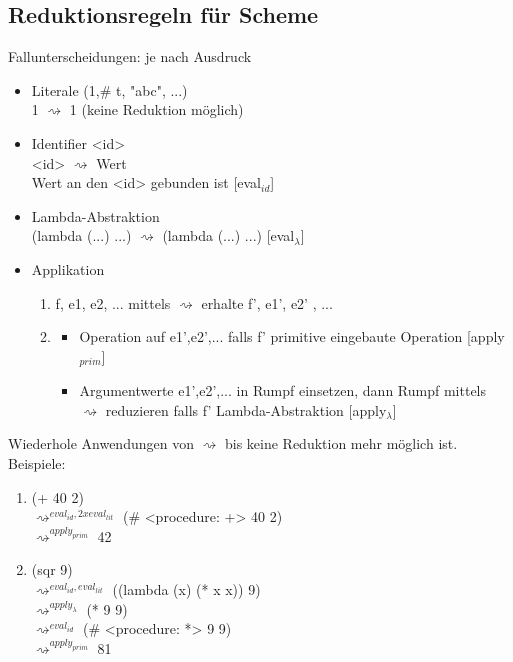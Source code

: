\documentclass[paper=a4, fontsize=11pt]{scrartcl}
\numberwithin{equation}{section}
\numberwithin{figure}{section}
\numberwithin{table}{section}
\begin{document}
\subsection{Reduktionsregeln für Scheme}
Fallunterscheidungen: je nach Ausdruck 
\begin{itemize}
\item Literale (1,\# t, "abc", ...) \\
         1 $\rightsquigarrow$ 1 (keine Reduktion möglich)
\item Identifier <id>\\
         <id> $\rightsquigarrow$ Wert \\
         Wert an den <id> gebunden ist [eval$_{id}$]
\item Lambda-Abstraktion \\
         (lambda (...) ...) $\rightsquigarrow$ (lambda (...) ...) [eval$_{\lambda}$]
\item Applikation                  
         \begin{enumerate}
         \item f, e1, e2, ... mittels $\rightsquigarrow$ erhalte f', e1', e2' , ...
         \item \begin{itemize}
                  \item Operation auf e1',e2',... falls f' primitive eingebaute Operation [apply$_{prim}$]
                  \item Argumentwerte e1',e2',... in Rumpf einsetzen, dann Rumpf mittels $\rightsquigarrow$ reduzieren falls f' Lambda-Abstraktion [apply$_{\lambda}$]         
                  \end{itemize}
         \end{enumerate}
\end{itemize}
Wiederhole Anwendungen von $\rightsquigarrow$ bis keine Reduktion mehr möglich ist. \\

Beispiele: 
\begin{enumerate}
\item (+ 40 2) \\
         $\rightsquigarrow^{eval_{id}, 2x eval_{lit}}$ (\# <procedure: +> 40 2) \\
         $\rightsquigarrow^{apply_{prim}}$ 42
\item (sqr 9) \\
         $\rightsquigarrow^{eval_{id},eval_{lit}}$ ((lambda (x) (* x x)) 9) \\
         $\rightsquigarrow^{apply_{\lambda}}$ (* 9 9) \\
         $\rightsquigarrow^{eval_{id}}$ (\# <procedure: *> 9 9) \\
         $\rightsquigarrow^{apply_{prim}}$ 81        
\end{enumerate}
\end{document}

